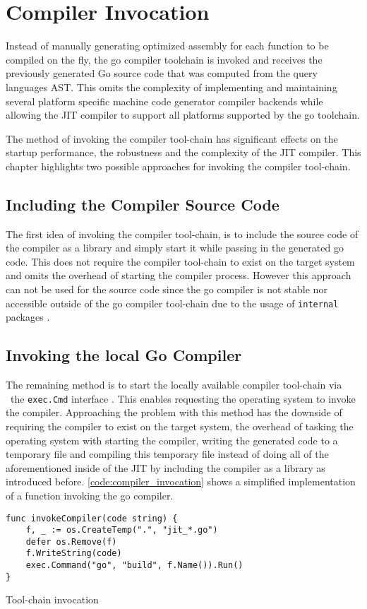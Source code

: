 \chapter{Compiler Invocation}

Instead of manually generating optimized assembly for each function to be
compiled on the fly, the go compiler toolchain is invoked and receives the
previously  generated Go source code that was computed from the query languages
AST. This omits the complexity of implementing and maintaining several platform
specific machine code generator compiler backends while allowing the JIT
compiler to support all platforms supported by the go toolchain.

The method of invoking the compiler tool-chain has significant effects on the
startup performance, the robustness and the complexity of the JIT compiler.
This chapter highlights two possible approaches for invoking the compiler
tool-chain. 

\section{Including the Compiler Source Code}

The first idea of invoking the compiler tool-chain, is to include the source
code of the compiler as a library and simply start it while passing in the
generated go code. This does not require the compiler tool-chain to exist on
the target system and omits the overhead of starting the compiler process.
However this approach can not be used for the source code since the go compiler
is not stable nor accessible outside of the go compiler tool-chain
\cite[\textit{(gcToolchain).gc}]{gc_source} due to the usage of
\texttt{internal} packages \cite{go_internal_dir}.

\section{Invoking the local Go Compiler}

The remaining method is to start the locally available compiler tool-chain via
\ the \texttt{exec.Cmd} interface \cite[Overview]{go_os_exec}. This enables
requesting the operating system to invoke the compiler. Approaching the problem
with this method has the downside of requiring the compiler to exist on the
target system, the overhead of tasking the operating system with starting the
compiler, writing the generated code to a temporary file and compiling this
temporary file instead of doing all of the aforementioned inside of the JIT by
including the compiler as a library as introduced before.
\autoref{code:compiler_invocation} shows a simplified implementation of a
function invoking the go compiler. 

\begin{listing}[H]
    \begin{verbatim}
func invokeCompiler(code string) {
    f, _ := os.CreateTemp(".", "jit_*.go")
    defer os.Remove(f)
    f.WriteString(code)
    exec.Command("go", "build", f.Name()).Run()
}
    \end{verbatim}
    \caption{Tool-chain invocation}
    \label{code:compiler_invocation}
\end{listing}

